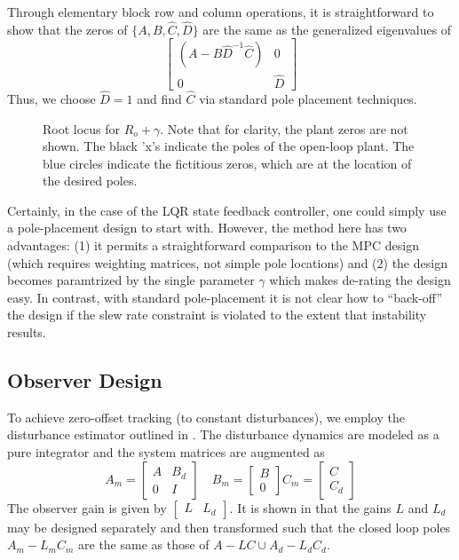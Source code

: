 \documentclass[journal,twocolumn,twoside]{IEEEtran}
\begin{document}
Through elementary block row and column operations, it is straightforward to show that the zeros of
$\{A, B, \hat C, \hat D\}$ are the same as the generalized eigenvalues of
\begin{equation}
  \begin{bmatrix}
    (A - B\hat{D}^{-1}\hat{C}) & 0\\
    0 & \hat{D}
  \end{bmatrix}
\end{equation}
Thus, we choose $\hat D = 1$ and find $\hat C$ via standard pole placement techniques.

\begin{figure}
  
  \caption{Root locus for $R_o + \gamma$. Note that for clarity, the plant zeros are not shown. The black 'x's indicate the poles of the open-loop plant. The blue circles indicate the fictitious zeros, which are at the location of the desired poles. }
  \label{fig:lqr_locus}
\end{figure}

Certainly, in the case of the LQR state feedback controller, one could simply use a pole-placement design to start with. However, the method here has two advantages: (1) it permits a straightforward comparison to the MPC design (which requires weighting matrices, not simple pole locations) and (2) the design becomes paramtrized by the single parameter $\gamma$ which makes de-rating the design easy. In contrast, with standard pole-placement it is not clear how to ``back-off'' the design if the slew rate constraint is violated to the extent that instability results. 


\subsection{Observer Design}\label{sec:dist_est}
To achieve zero-offset tracking (to constant disturbances), we employ the disturbance estimator outlined in \cite{maeder_offset-free_2007}. The disturbance dynamics are modeled as a pure integrator and the system matrices are augmented as
\begin{equation}
  A_m = \begin{bmatrix}
    A & B_d \\ 0 & I
  \end{bmatrix}\quad
  B_m =
  \begin{bmatrix}
    B \\ 0
  \end{bmatrix}
  C_m = 
    \begin{bmatrix}
    C \\ C_d
  \end{bmatrix}
\end{equation}
The observer gain is given by $\begin{bmatrix}L & L_d\end{bmatrix}$. It is shown in \cite{maeder_offset-free_2007} that the gains $L$ and $L_d$ may be designed separately and then transformed such that the closed loop poles $A_m - L_mC_m$ are the same as those of $A-LC\cup A_d-L_dC_d$.
\end{document}
